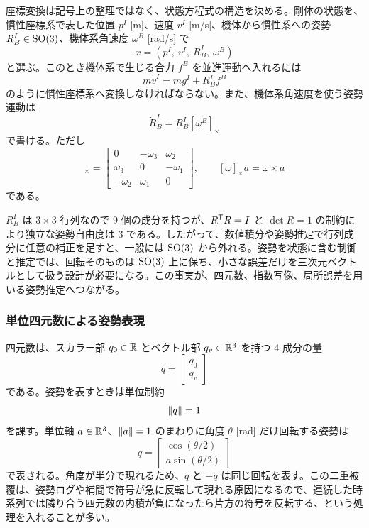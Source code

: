 座標変換は記号上の整理ではなく、状態方程式の構造を決める。剛体の状態を、慣性座標系で表した位置 $p^I$ [m]、速度 $v^I$ [m/s]、機体から慣性系への姿勢 $R^I_B\in\operatorname{SO}(3)$、機体系角速度 $\omega^B$ [rad/s] で
\begin{equation}
  x=\left(p^I,\ v^I,\ R^I_B,\ \omega^B\right)
\end{equation}
と選ぶ。このとき機体系で生じる合力 $f^B$ を並進運動へ入れるには
\begin{equation}
  m\dot{v}^I=mg^I+R^I_B f^B
\end{equation}
のように慣性座標系へ変換しなければならない。また、機体系角速度を使う姿勢運動は
\begin{equation}
  \dot{R}^I_B=R^I_B[\omega^B]_\times
\end{equation}
で書ける。ただし
\begin{equation}
  [\omega]_\times=
  \begin{bmatrix}
    0&-\omega_3&\omega_2\\
    \omega_3&0&-\omega_1\\
    -\omega_2&\omega_1&0
  \end{bmatrix},
  \qquad
  [\omega]_\times a=\omega\times a
\end{equation}
である。

$R^I_B$ は $3\times3$ 行列なので 9 個の成分を持つが、$R^{\mathsf{T}} R=I$ と $\det R=1$ の制約により独立な姿勢自由度は 3 である。したがって、数値積分や姿勢推定で行列成分に任意の補正を足すと、一般には $\operatorname{SO}(3)$ から外れる。姿勢を状態に含む制御と推定では、回転そのものは $\operatorname{SO}(3)$ 上に保ち、小さな誤差だけを三次元ベクトルとして扱う設計が必要になる。この事実が、四元数、指数写像、局所誤差を用いる姿勢推定へつながる。

\subsubsection{単位四元数による姿勢表現}

四元数は、スカラー部 $q_0\in\mathbb{R}$ とベクトル部 $q_v\in\mathbb{R}^3$ を持つ 4 成分の量
\begin{equation}
  q=
  \begin{bmatrix}
    q_0\\ q_v
  \end{bmatrix}
\end{equation}
である。姿勢を表すときは単位制約
\begin{equation}
  \left\|q\right\|=1
\end{equation}
を課す。単位軸 $a\in\mathbb{R}^3$、$\left\|a\right\|=1$ のまわりに角度 $\theta$ [rad] だけ回転する姿勢は
\begin{equation}
  q=
  \begin{bmatrix}
    \cos(\theta/2)\\
    a\sin(\theta/2)
  \end{bmatrix}
\end{equation}
で表される。角度が半分で現れるため、$q$ と $-q$ は同じ回転を表す。この二重被覆は、姿勢ログや補間で符号が急に反転して現れる原因になるので、連続した時系列では隣り合う四元数の内積が負になったら片方の符号を反転する、という処理を入れることが多い。

